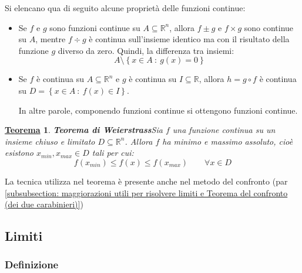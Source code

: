 \documentclass[a4paper]{article}
\newtheorem{theorem}{\textcolor{Red3}{\underline{Teorema}}}
\begin{document}
	\noindent
	Si elencano qua di seguito alcune proprietà delle funzioni continue:
	\begin{itemize}
		\item Se $f$ e $g$ sono funzioni continue su $A \subseteq \mathbb{R}^{n}$, allora $f \pm g$ e $f \times g$ sono continue su $A$, mentre $f \div g$ è continua sull'insieme identico ma con il risultato della funzione $g$ diverso da zero. Quindi, la differenza tra insiemi:
		\begin{equation*}
			A \setminus \left\{x \in A \: : \: g\left(x\right) = 0\right\}
		\end{equation*}

		\item Se $f$ è continua su $A \subseteq \mathbb{R}^{n}$ e $g$ è continua su $I \subseteq \mathbb{R}$, allora $h=g \circ f$ è continua su $D = \left\{x \in A \: : \: f\left(x\right) \in I\right\}$.
		
		In altre parole, componendo funzioni continue si ottengono funzioni continue.
	\end{itemize}
	\begin{theorem}{\textbf{Teorema di Weierstrass}}\label{theorem: Weierstrass}
		Sia $f$ una funzione continua su un insieme chiuso e limitato $D \subseteq \mathbb{R}^{n}$. Allora $f$ ha minimo e massimo assoluto, cioè esistono $x_{min}, x_{max} \in D$ tali per cui:
		\begin{equation*}
			f\left(x_{min}\right) \le f\left(x\right) \le f\left(x_{max}\right) \hspace{2em} \forall x \in D
		\end{equation*}
	\end{theorem}
	La tecnica utilizza nel teorema è presente anche nel metodo del confronto (par \ref{subsubsection: maggiorazioni utili per risolvere limiti e Teorema del confronto (dei due carabinieri)})
	\newpage

	\subsection{Limiti}\label{subsection: limiti}

	\subsubsection{Definizione}\label{subsubsection: definizione di limiti}
\end{document}
